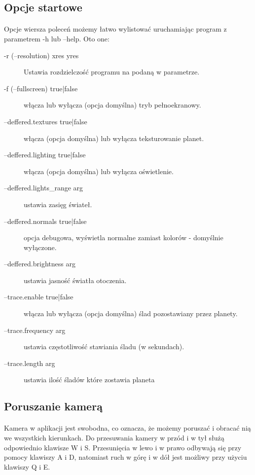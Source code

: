 \subsection{Opcje startowe}\label{sub:uruchamianie programu}
\paragraph{}
Opcje wiersza poleceń możemy łatwo wylistować uruchamiając program z parametrem -h lub --help. Oto one:

\begin{description}
\item[-r (--resolution) xres yres] Ustawia rozdzielczość programu na podaną w parametrze.
\item[-f (--fullscreen) {true|false}] włącza lub wyłącza (opcja domyślna) tryb pełnoekranowy.
\item[--deffered.textures {true|false}] włącza (opcja domyślna) lub wyłącza teksturowanie planet.
\item[--deffered.lighting {true|false}] włącza (opcja domyślna) lub wyłącza oświetlenie.
\item[--deffered.lights\_range arg] ustawia zasięg świateł.
\item[--deffered.normals {true|false}] opcja debugowa, wyświetla normalne zamiast kolorów - domyślnie wyłączone.
\item[--deffered.brightness arg] ustawia jasność światła otoczenia.
\item[--trace.enable {true|false}] włącza lub wyłącza (opcja domyślna) ślad pozostawiany przez planety.
\item[--trace.frequency arg] ustawia częstotliwość stawiania śladu (w sekundach).
\item[--trace.length arg] ustawia ilość śladów które zostawia planeta
\end{description}

\subsection{Poruszanie kamerą}\label{sub:poruszanie kamerą}
\paragraph{}
Kamera w aplikacji jest swobodna, co oznacza, że możemy poruszać i obracać nią we wszystkich kierunkach. Do przesuwania kamery w przód i w tył służą odpowiednio klawisze W i S. Przesunięcia w lewo i w prawo odbywają się przy pomocy klawiszy A i D, natomiast ruch w górę i w dół jest możliwy przy użyciu klawiszy Q i E.
